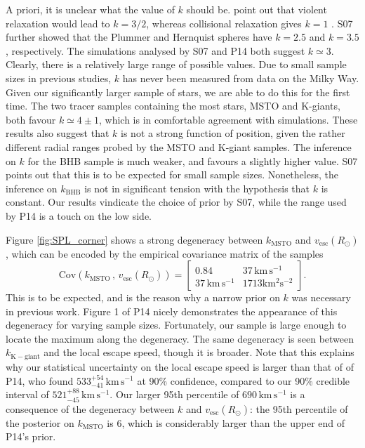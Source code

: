 \documentclass[useAMS,twocolumn,usenatbib]{mn2e}
\def\kms{{\,\mathrm{km\,s^{-1}}}}
\def\vesc{{v_\mathrm{esc}}}
\begin{document}
A priori, it is unclear what the value of $k$ should be. 
\citet{Le90} point out that violent relaxation would lead to $k=3/2$, whereas collisional relaxation gives $k=1$ \citep{Sp72}. 
S07 further showed that the Plummer and Hernquist spheres \citep{BT08} have $k=2.5$ and $k=3.5$, respectively. 
The simulations analysed by S07 and P14 both suggest $k\simeq3$. 
Clearly, there is a relatively large range of possible values.  
Due to small sample sizes in previous studies, $k$ has never been measured from data on the Milky Way. 
Given our significantly larger sample of stars, we are able to do this for the first time. 
The two tracer samples containing the most stars, MSTO and K-giants, both favour $k\simeq4\pm1$, which is in comfortable agreement with simulations.
These results also suggest that $k$ is not a strong function of position, given the rather different radial ranges probed by the MSTO and K-giant samples.
The inference on $k$ for the BHB sample is much weaker, and favours a slightly higher value. 
S07 points out that this is to be expected for small sample sizes. 
Nonetheless, the inference on $k_\mathrm{BHB}$ is not in significant tension with the hypothesis that $k$ is constant. 
Our results vindicate the choice of prior by S07, while the range used by P14 is a touch on the low side.

Figure \ref{fig:SPL_corner} shows a strong degeneracy between $k_\mathrm{MSTO}$ and $\vesc(R_\odot)$, which can be encoded by the empirical covariance matrix of the samples
%
\begin{equation}
\mathrm{Cov}\left(k_\mathrm{MSTO}\,,\,\vesc(R_\odot)\right) = \begin{bmatrix} 0.84 & 37\kms \\ 37\kms & 1713 \mathrm{km^2s^{-2}}\end{bmatrix}.
\end{equation}
%
This is to be expected, and is the reason why a narrow prior on $k$ was necessary in previous work. 
Figure 1 of P14 nicely demonstrates the appearance of this degeneracy for varying sample sizes. 
Fortunately, our sample is large enough to locate the maximum along the degeneracy. 
The same degeneracy is seen between $k_\mathrm{K-giant}$ and the local escape speed, though it is broader.
Note that this explains why our statistical uncertainty on the local escape speed is larger than that of of P14, who found $533^{+54}_{-41}\kms$ at 90\% confidence, compared to our 90\% credible interval of $521^{+88}_{-45}\kms$.
Our larger 95th percentile of $690\kms$ is a consequence of the degeneracy between $k$ and $\vesc(R_\odot)$: the 95th percentile of the posterior on $k_\mathrm{MSTO}$ is 6, which is considerably larger than the upper end of P14's prior.
\end{document}
